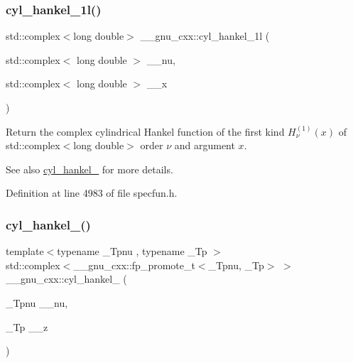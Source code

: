 \subsubsection{\texorpdfstring{cyl\+\_\+hankel\+\_\+1l()}{cyl\_hankel\_1l()}\hspace{0.1cm}{\footnotesize\ttfamily [2/2]}}
{\footnotesize\ttfamily std\+::complex$<$long double$>$ \+\_\+\+\_\+gnu\+\_\+cxx\+::cyl\+\_\+hankel\+\_\+1l (\begin{DoxyParamCaption}\item[{std\+::complex$<$ long double $>$}]{\+\_\+\+\_\+nu,  }\item[{std\+::complex$<$ long double $>$}]{\+\_\+\+\_\+x }\end{DoxyParamCaption})\hspace{0.3cm}{\ttfamily [inline]}}

Return the complex cylindrical Hankel function of the first kind $ H^{(1)}_\nu(x) $ of {\ttfamily std\+::complex$<$long double$>$} order $ \nu $ and argument $ x $.

\begin{DoxySeeAlso}{See also}
\hyperlink{group__gnu__math__spec__func_ga5329bba77d10a9d2f15d9bbe43a70db3}{cyl\+\_\+hankel\+\_} for more details. 
\end{DoxySeeAlso}


Definition at line 4983 of file specfun.\+h.

\mbox{\label{group__gnu__math__spec__func_ga7ebc71dd48ac97255d72f5f5f43dfd8e}} 
\subsubsection{\texorpdfstring{cyl\+\_\+hankel\+\_()}{cyl\_hankel\_2()}\hspace{0.1cm}{\footnotesize\ttfamily [1/2]}}
{\footnotesize\ttfamily template$<$typename \+\_\+\+Tpnu , typename \+\_\+\+Tp $>$ \\
std\+::complex$<$\+\_\+\+\_\+gnu\+\_\+cxx\+::fp\+\_\+promote\+\_\+t$<$\+\_\+\+Tpnu, \+\_\+\+Tp$>$ $>$ \+\_\+\+\_\+gnu\+\_\+cxx\+::cyl\+\_\+hankel\+\_ (\begin{DoxyParamCaption}\item[{\+\_\+\+Tpnu}]{\+\_\+\+\_\+nu,  }\item[{\+\_\+\+Tp}]{\+\_\+\+\_\+z }\end{DoxyParamCaption})\hspace{0.3cm}{\ttfamily [inline]}}

